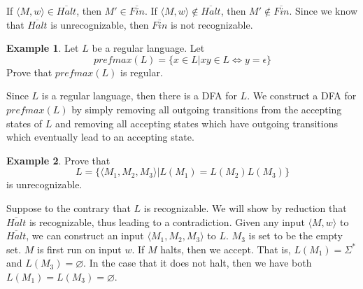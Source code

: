 \documentclass[11pt]{article}
\let\emptyset\varnothing
\theoremstyle{plain} %
\theoremstyle{definition}
\theoremstyle{example}
\newtheorem*{example}{Example}
\theoremstyle{remark}
\begin{document}
If $\langle M, w \rangle \in \overline{Halt}$, then $M' \in \overline{Fin}$.
If $\langle M, w \rangle \not \in \overline{Halt}$, then $M' \not \in \overline{Fin}$. Since we know that $\overline{Halt}$ is unrecognizable, then $\overline{Fin}$ is not recognizable.

\begin{example}
Let $L$ be a regular language. Let $$prefmax(L) = \{x\in L | xy \in L \iff y = \epsilon\}$$ Prove that $prefmax(L)$ is regular.
\end{example}

Since $L$ is a regular language, then there is a DFA for $L$. We construct a DFA for $prefmax(L)$ by simply removing all outgoing transitions from the accepting states of $L$ and removing all accepting states which have outgoing transitions which eventually lead to an accepting state. 

\begin{example}
Prove that $$L = \{\langle M_1, M_2, M_3\rangle | L(M_1) = L(M_2)L(M_3)\}$$ is unrecognizable.
\end{example}

Suppose to the contrary that $L$ is recognizable. We will show by reduction that $\overline{Halt}$ is recognizable, thus leading to a contradiction. Given any input $\langle M, w \rangle$ to $\overline{Halt}$, we can construct an input $\langle M_1, M_2, M_3\rangle$ to $L$. $M_3$ is set to be the empty set. $M$ is first run on input $w$. If $M$ halts, then we accept. That is, $L(M_1) = \Sigma^*$ and $L(M_3) = \emptyset$. In the case that it does not halt, then we have both $L(M_1) = L(M_3) = \emptyset$. 
\end{document}
